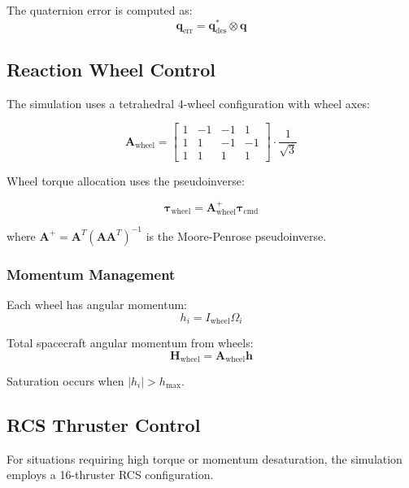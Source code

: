 \documentclass[11pt,a4paper]{article}
\newcommand{\vect}[1]{\bm{#1}}
\newcommand{\mat}[1]{\mathbf{#1}}
\newcommand{\quat}[1]{\mathbf{#1}}
\begin{document}
The quaternion error is computed as:
\begin{equation}
    \quat{q}_\text{err} = \quat{q}_\text{des}^* \otimes \quat{q}
\end{equation}

\subsection{Reaction Wheel Control}

The simulation uses a tetrahedral 4-wheel configuration with wheel axes:

\begin{equation}
    \mat{A}_\text{wheel} = \begin{bmatrix}
        1 & -1 & -1 & 1 \\
        1 & 1 & -1 & -1 \\
        1 & 1 & 1 & 1
    \end{bmatrix} \cdot \frac{1}{\sqrt{3}}
\end{equation}

Wheel torque allocation uses the pseudoinverse:

\begin{equation}
    \vect{\tau}_\text{wheel} = \mat{A}_\text{wheel}^+ \vect{\tau}_\text{cmd}
\end{equation}

where $\mat{A}^+ = \mat{A}^T (\mat{A} \mat{A}^T)^{-1}$ is the Moore-Penrose pseudoinverse.

\subsubsection{Momentum Management}

Each wheel has angular momentum:
\begin{equation}
    h_i = I_\text{wheel} \Omega_i
\end{equation}

Total spacecraft angular momentum from wheels:
\begin{equation}
    \vect{H}_\text{wheel} = \mat{A}_\text{wheel} \vect{h}
\end{equation}

Saturation occurs when $|h_i| > h_\text{max}$.

\subsection{RCS Thruster Control}

For situations requiring high torque or momentum desaturation, the simulation employs a 16-thruster RCS configuration.
\end{document}
